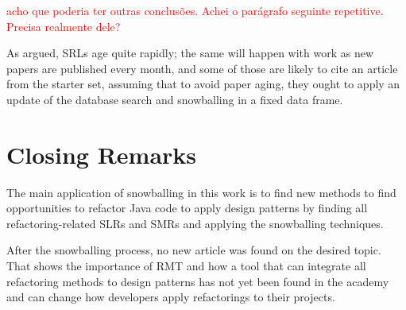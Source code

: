 \textcolor{red}{acho que poderia ter outras conclusões. Achei o parágrafo seguinte repetitive. Precisa realmente dele?}

As argued, SRLs age quite rapidly; the same will happen with work as new papers are published every month, and some of those are likely to cite an article from the starter set, assuming that to avoid paper aging, they ought to apply an update of the database search and snowballing in a fixed data frame.

\section{Closing Remarks}
\label{sec-cloasing-remarks}

The main application of snowballing in this work is to find new methods to find opportunities to refactor Java code to apply design patterns by finding all refactoring-related SLRs and SMRs and applying the snowballing techniques. 

After the snowballing process, no new article was found on the desired topic. That shows the importance of RMT and how a tool that can integrate all refactoring methods to design patterns has not yet been found in the academy and can change how developers apply refactorings to their projects.